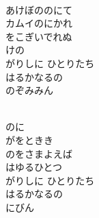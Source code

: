 \documentclass[10pt,b5j]{tarticle} %
\begin{document}
\vspace{1.5em} %
\newcommand{\linespace}{0.5em} %
\newcommand{\blocksize}{0.33\hsize} %
\newcommand{\itemmargin}{3em} %
\begin{enumerate} %
    \setlength{\itemindent}{\itemmargin} %
    \begin{minipage}[c]{\blocksize}
    
        \vspace{\linespace}
        \item~\\
        あけぼののにて\\
        カムイのにかれ\\
        をこぎいでれぬ\\
        けの\\
        がりしに ひとりたち\\
        はるかなるの\\
        のぞみみん
        
        \vspace{\linespace}
        \item~\\
        のに\\
        がをときき\\
        のをさまよえば\\
        はゆるひとつ\\
        がりしに ひとりたち\\
        はるかなるの\\
        にびん
        
    \end{minipage}
    \begin{minipage}[c]{\blocksize}
        

\end{minipage}
\end{enumerate}
\end{document}
